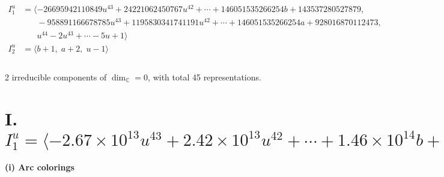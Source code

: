 \documentclass[1p]{elsarticle_modified}
\theoremstyle{definition}
\begin{document}
\begin{align*}
I^u_{1}&=\langle 
-26695942110849 u^{43}+24221062450767 u^{42}+\cdots+146051535266254 b+143537280527879,\\
\phantom{I^u_{1}}&\phantom{= \langle  }-958891166678785 u^{43}+1195830341741191 u^{42}+\cdots+146051535266254 a+928016870112473,\\
\phantom{I^u_{1}}&\phantom{= \langle  }u^{44}-2 u^{43}+\cdots-5 u+1\rangle \\
I^u_{2}&=\langle 
b+1,\;a+2,\;u-1\rangle \\
\\
\end{align*}
\raggedright * 2 irreducible components of $\dim_{\mathbb{C}}=0$, with total 45 representations.\\
\newpage
\renewcommand{\arraystretch}{1}
\centering \section*{I. $I^u_{1}= \langle -2.67\times10^{13} u^{43}+2.42\times10^{13} u^{42}+\cdots+1.46\times10^{14} b+1.44\times10^{14},\;-9.59\times10^{14} u^{43}+1.20\times10^{15} u^{42}+\cdots+1.46\times10^{14} a+9.28\times10^{14},\;u^{44}-2 u^{43}+\cdots-5 u+1 \rangle$}
\flushleft \textbf{(i) Arc colorings}\\
\end{document}
